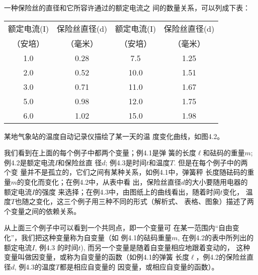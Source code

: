 \begin{example}
    一种保险丝的直径和它所容许通过的额定电流之
    间的数量关系，可以列成下表：
\begin{center}
\begin{tabular}{cccc}
    \hline
    额定电流(I)  &  保险丝直径(d)  &  额定电流(I) &  保险丝直径(d)\\
（安培）  &  （毫米）  &  （安培）  &  （毫米）  \\
\hline
1.0  &  0.28  &  7.5  &  1.25\\
2.0  &  0.52  &  10.0  &  1.51\\
3.0  &  0.71  &  11.0  &  1.67\\
5.0  &  0.98  &  12.0  &  1.75  \\
6.0  &  1.02  &  15.0  &  1.98\\
\hline
\end{tabular}
\end{center}


\end{example}

\begin{example}
    某地气象站的温度自动记录仪描绘了某一天的温
    度变化曲线，如图4.2。
\end{example}

\begin{figure}[htp]
    \centering
{}
    \caption{}
\end{figure}


我们看到在上面的每个例子中都两个变量；例4.1是弹
簧的长度$\ell$和砝码的重量$m$; 例4.2是额定电流$I$和保险丝直
径$d$; 例4.3是时间$t$和温度$T$. 但是在每个例子中的两个变
量并不是孤立的，它们之间有某种关系，如例4.1中，弹簧秤
长度随砝码的重量$m$的变化而变化；在例4.2中，从表中看
出，保险丝直径$d$的大小要随用电器的额定电流$I$的强度
来选择；在例4.3中，由图纸上的曲线看出，随着时间$t$变化，
温度$T$也随之变化，这三个例子用三种不同的形式（解析式、
表格、图象）描述了两个变量之间的依赖关系。

从上面三个例子中可以看到一个共同点，即一个变量可
在某一范围内“自由变化”，我们把这种变量称为自变量（如
例4.1的砝码重量$m$, 在例4.2的表中所列出的额定电流$I$, 例4.3
的时间$t$), 而另一个变量是随着自变量相应地跟着变动的，
这种变量叫做因变量，或称为自变量的函数（如例4.1的弹簧
长度$\ell$，例4.2的保险丝直径$d$, 例4.3的温度$T$都是相应自变量的
因变量，或相应自变量的函数）。


